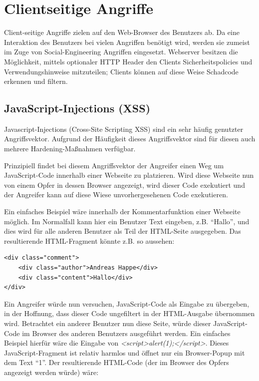 \chapter{Clientseitige Angriffe}

Client-seitige Angriffe zielen auf den Web-Browser des Benutzers ab. Da eine Interaktion des Benutzers bei vielen Angriffen benötigt wird, werden sie zumeist im Zuge von Social-Engineering Angriffen eingesetzt. Webserver besitzen die Möglichkeit, mittels optionaler HTTP Header den Clients Sicherheitspolicies und Verwendungshinweise mitzuteilen; Clients können auf diese Weise Schadcode erkennen und filtern.

\section{JavaScript-Injections (XSS)}
\label{xss}

Javascript-Injections (Cross-Site Scripting XSS) sind ein sehr häufig genutzter Angriffsvektor. Aufgrund der Häufigkeit dieses Angriffsvektor sind für diesen auch mehrere Hardening-Maßnahmen verfügbar.

Prinzipiell findet bei diesem Angriffsvektor der Angreifer einen Weg um JavaScript-Code innerhalb einer Webseite zu platzieren. Wird diese Webseite nun von einem Opfer in dessen Browser angezeigt, wird dieser Code exekutiert und der Angreifer kann auf diese Wiese unvorhergesehenen Code exekutieren.

Ein einfaches Beispiel wäre innerhalb der Kommentarfunktion einer Webseite möglich. Im Normalfall kann hier ein Benutzer Text eingeben, z.B. ``Hallo'', und dies wird für alle anderen Benutzer als Teil der HTML-Seite ausgegeben. Das resultierende HTML-Fragment könnte z.B. so aussehen:

\begin{verbatim}
<div class="comment">
	<div class="author">Andreas Happe</div>
	<div class="content">Hallo</div>
</div>
\end{verbatim}

Ein Angreifer würde nun versuchen, JavaScript-Code als Eingabe zu übergeben, in der Hoffnung, dass dieser Code ungefiltert in der HTML-Ausgabe übernommen wird. Betrachtet ein anderer Benutzer nun diese Seite, würde dieser JavaScript-Code im Browser des anderen Benutzers ausgeführt werden. Ein einfaches Beispiel hierfür wäre die Eingabe von \textit{<script>alert(1);</script>}. Dieses JavaScript-Fragment ist relativ harmlos und öffnet nur ein Browser-Popup mit dem Text ``1''. Der resultierende HTML-Code (der im Browser des Opfers angezeigt werden würde) wäre:

